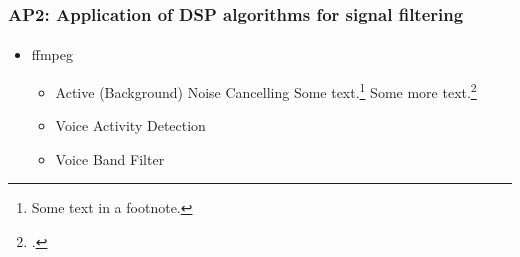 

\begin{frame}		
	
	\frametitle{AP2: Application of DSP algorithms for signal filtering}
	\framesubtitle{}
	
	\begin{itemize}
		\item ffmpeg
		\begin{itemize}
			\item Active (Background) Noise Cancelling Some text.\footnote{Some text in a footnote.} Some more text.\footcite{foo12}
			\item Voice Activity Detection
			\item Voice Band Filter
		\end{itemize}
	\end{itemize}
	
	
\end{frame}